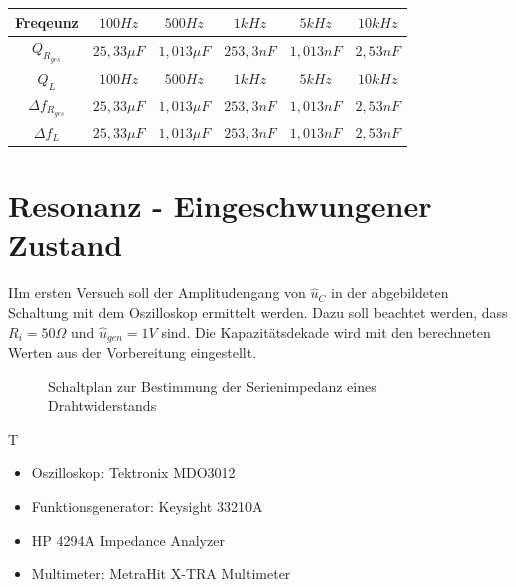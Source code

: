 \documentclass{article}
\begin{document}
\begin{center}

  \begin{tabular}{|c|c|c|c|c|c|}    
    \hline
    Freqeunz               & $100 Hz$                   & $500Hz$                   & $1kHz$            & $5kHz$          & $10kHz$              \\
    \hline
    $Q_{R_{ges}}$              & $25,33\mu F$               & $1,013\mu F$                     & $253,3nF$            & $1,013nF$           & $2,53nF$              \\
    \hline
    $Q_L$              & $100 Hz$                   & $500Hz$                   & $1kHz$            & $5kHz$          & $10kHz$              \\
    \hline
    $\Delta f_{R_{ges}}$              & $25,33\mu F$                      & $1,013\mu F$                     & $253,3nF$            & $1,013nF$           & $2,53nF$              \\
    \hline
    $\Delta f_L$              & $25,33\mu F$                      & $1,013\mu F$                     & $253,3nF$            & $1,013nF$           & $2,53nF$              \\
    \hline
  \end{tabular}

\end{center}



\newpage
\section{Resonanz - Eingeschwungener Zustand}
\begin{task}
  IIm ersten Versuch soll der Amplitudengang von $\hat{u}_C$ in der abgebildeten Schaltung mit dem Oszilloskop ermittelt werden. Dazu soll beachtet werden,
  dass $R_i = 50\Omega$ und $\hat{u}_{gen} = 1V$ sind. Die Kapazitätsdekade wird mit den berechneten Werten aus der Vorbereitung eingestellt.
\end{task}
\begin{figure}[h]
  \begin{center}

    \caption{Schaltplan zur Bestimmung der Serienimpedanz eines Drahtwiderstands}
  \end{center}
\end{figure}
\begin{devlist}
  T
  \begin{itemize}
    \item Oszilloskop: Tektronix MDO3012
    \item Funktionsgenerator: Keysight 33210A
    \item HP 4294A Impedance Analyzer
    \item Multimeter: MetraHit X-TRA Multimeter
  \end{itemize}
\end{devlist}
\end{document}
